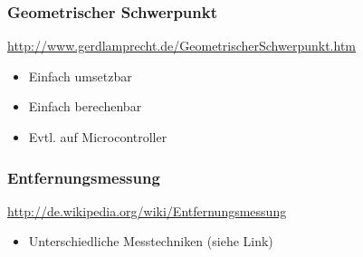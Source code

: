 \subsubsection{Geometrischer Schwerpunkt}
\url{http://www.gerdlamprecht.de/GeometrischerSchwerpunkt.htm}
\begin{itemize}
    \item Einfach umsetzbar
    \item Einfach berechenbar
    \item Evtl. auf Microcontroller
\end{itemize}

\subsubsection{Entfernungsmessung}
\url{http://de.wikipedia.org/wiki/Entfernungsmessung}
\begin{itemize}
    \item Unterschiedliche Messtechniken (siehe Link)
\end{itemize}
